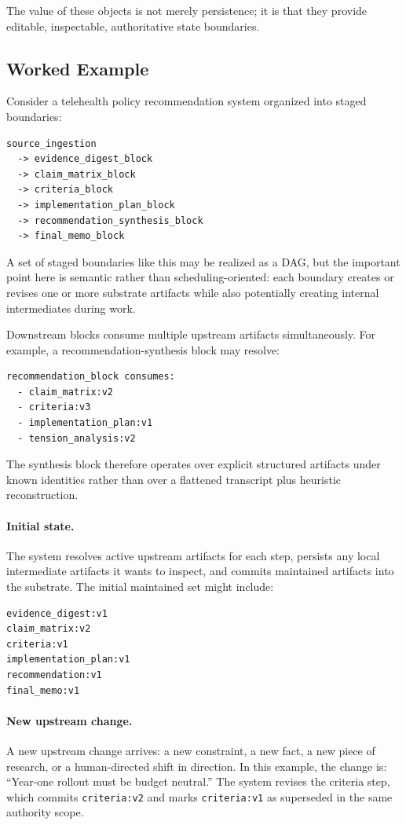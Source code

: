 \documentclass{article}
\begin{document}
The value of these objects is not merely persistence; it is that they provide editable, inspectable, authoritative state boundaries.

\subsection{Worked Example}

Consider a telehealth policy recommendation system organized into staged boundaries:

\begin{verbatim}
source_ingestion
  -> evidence_digest_block
  -> claim_matrix_block
  -> criteria_block
  -> implementation_plan_block
  -> recommendation_synthesis_block
  -> final_memo_block
\end{verbatim}

A set of staged boundaries like this may be realized as a DAG, but the important point here is semantic rather than scheduling-oriented: each boundary creates or revises one or more substrate artifacts while also potentially creating internal intermediates during work.

Downstream blocks consume multiple upstream artifacts simultaneously. For example, a recommendation-synthesis block may resolve:

\begin{verbatim}
recommendation_block consumes:
  - claim_matrix:v2
  - criteria:v3
  - implementation_plan:v1
  - tension_analysis:v2
\end{verbatim}

The synthesis block therefore operates over explicit structured artifacts under known identities rather than over a flattened transcript plus heuristic reconstruction.

\paragraph{Initial state.} The system resolves active upstream artifacts for each step, persists any local intermediate artifacts it wants to inspect, and commits maintained artifacts into the substrate. The initial maintained set might include:

\begin{verbatim}
evidence_digest:v1
claim_matrix:v2
criteria:v1
implementation_plan:v1
recommendation:v1
final_memo:v1
\end{verbatim}

\paragraph{New upstream change.} A new upstream change arrives: a new constraint, a new fact, a new piece of research, or a human-directed shift in direction. In this example, the change is: ``Year-one rollout must be budget neutral.'' The system revises the criteria step, which commits \texttt{criteria:v2} and marks \texttt{criteria:v1} as superseded in the same authority scope.
\end{document}
